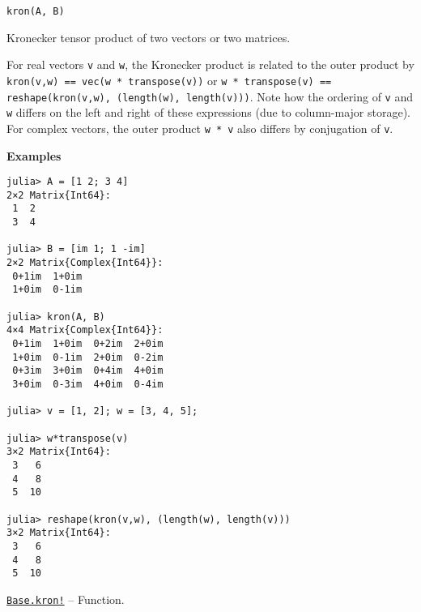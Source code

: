 \begin{adjustwidth}{2em}{0pt}


\begin{verbatim}
kron(A, B)
\end{verbatim}

Kronecker tensor product of two vectors or two matrices.

For real vectors \texttt{v} and \texttt{w}, the Kronecker product is related to the outer product by \texttt{kron(v,w) == vec(w * transpose(v))} or \texttt{w * transpose(v) == reshape(kron(v,w), (length(w), length(v)))}. Note how the ordering of \texttt{v} and \texttt{w} differs on the left and right of these expressions (due to column-major storage). For complex vectors, the outer product \texttt{w * v{\textquotesingle}} also differs by conjugation of \texttt{v}.

\textbf{Examples}


\begin{verbatim}
julia> A = [1 2; 3 4]
2×2 Matrix{Int64}:
 1  2
 3  4

julia> B = [im 1; 1 -im]
2×2 Matrix{Complex{Int64}}:
 0+1im  1+0im
 1+0im  0-1im

julia> kron(A, B)
4×4 Matrix{Complex{Int64}}:
 0+1im  1+0im  0+2im  2+0im
 1+0im  0-1im  2+0im  0-2im
 0+3im  3+0im  0+4im  4+0im
 3+0im  0-3im  4+0im  0-4im

julia> v = [1, 2]; w = [3, 4, 5];

julia> w*transpose(v)
3×2 Matrix{Int64}:
 3   6
 4   8
 5  10

julia> reshape(kron(v,w), (length(w), length(v)))
3×2 Matrix{Int64}:
 3   6
 4   8
 5  10
\end{verbatim}



\end{adjustwidth}
\hypertarget{440830659036864982}{}
\hyperlink{440830659036864982}{\texttt{Base.kron!}}  -- {Function.}


